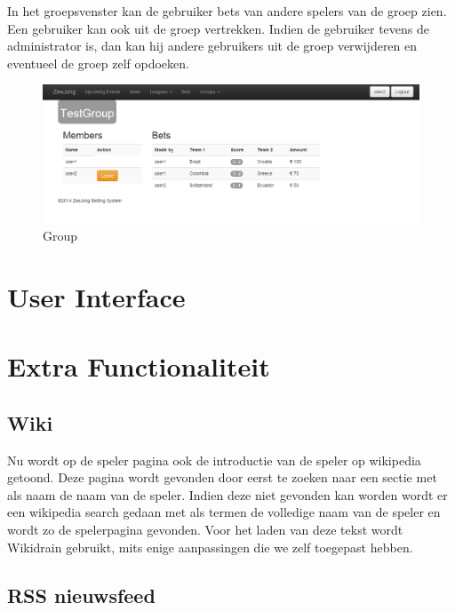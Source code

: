 \documentclass[11pt]{article}
\begin{document}
In het groepsvenster kan de gebruiker bets van andere spelers van de groep zien.  Een gebruiker kan ook uit de groep vertrekken.  Indien de gebruiker tevens de administrator is, dan kan hij andere gebruikers uit de groep verwijderen en eventueel de groep zelf opdoeken.\\

\begin{figure}[h!]
	\begin{center}
	\includegraphics[scale=0.4]{group.png}

	\caption{Group}
	\label{fig:group}
	\end{center}
\end{figure}

\section{User Interface}





\section{Extra Functionaliteit}


\subsection{Wiki}

Nu wordt op de speler pagina ook de introductie van de speler op wikipedia getoond.
Deze pagina wordt gevonden door eerst te zoeken naar een sectie met als naam de naam van de speler.
Indien deze niet gevonden kan worden wordt er een wikipedia search gedaan met als termen de volledige naam van de speler en wordt zo de spelerpagina gevonden.
Voor het laden van deze tekst wordt Wikidrain gebruikt, mits enige aanpassingen die we zelf toegepast hebben.


\subsection{RSS nieuwsfeed}
\end{document}
